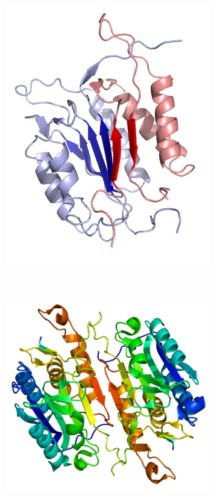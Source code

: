\documentclass[pdftex,12pt,a4paper]{report}
\begin{document}
\begin{figure}[H]
\begin{subfigure}{0.4\textwidth}
  \centering
  \includegraphics[width=\textwidth]{images/caspase3_dimer}
  \caption{}
  \label{fig:caspase3_dimer}
\end{subfigure}%
~
\begin{subfigure}{0.4\textwidth}
  \centering
  \includegraphics[width=\textwidth]{images/caspase7_dimer}
  \caption{}
  \label{fig:caspase37_dimer}
\end{subfigure}%


\end{figure}
\end{document}
